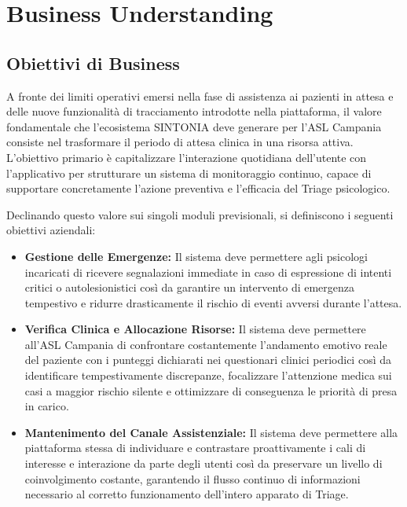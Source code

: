 \chapter{Business Understanding}
\label{ch:business_understanding}

\section{Obiettivi di Business}
\label{sec:obiettivi_business}

A fronte dei limiti operativi emersi nella fase di assistenza ai pazienti in attesa e delle nuove funzionalità di tracciamento introdotte nella piattaforma, il valore fondamentale che l'ecosistema SINTONIA deve generare per l'ASL Campania consiste nel trasformare il periodo di attesa clinica in una risorsa attiva. L'obiettivo primario è capitalizzare l'interazione quotidiana dell'utente con l'applicativo per strutturare un sistema di monitoraggio continuo, capace di supportare concretamente l'azione preventiva e l'efficacia del Triage psicologico.

Declinando questo valore sui singoli moduli previsionali, si definiscono i seguenti obiettivi aziendali:

\begin{itemize}
    \item \textbf{Gestione delle Emergenze:} Il sistema deve permettere agli psicologi incaricati di ricevere segnalazioni immediate in caso di espressione di intenti critici o autolesionistici così da garantire un intervento di emergenza tempestivo e ridurre drasticamente il rischio di eventi avversi durante l'attesa.

    \item \textbf{Verifica Clinica e Allocazione Risorse:} Il sistema deve permettere all'ASL Campania di confrontare costantemente l'andamento emotivo reale del paziente con i punteggi dichiarati nei questionari clinici periodici così da identificare tempestivamente discrepanze, focalizzare l'attenzione medica sui casi a maggior rischio silente e ottimizzare di conseguenza le priorità di presa in carico.

    \item \textbf{Mantenimento del Canale Assistenziale:} Il sistema deve permettere alla piattaforma stessa di individuare e contrastare proattivamente i cali di interesse e interazione da parte degli utenti così da preservare un livello di coinvolgimento costante, garantendo il flusso continuo di informazioni necessario al corretto funzionamento dell'intero apparato di Triage.
\end{itemize}

